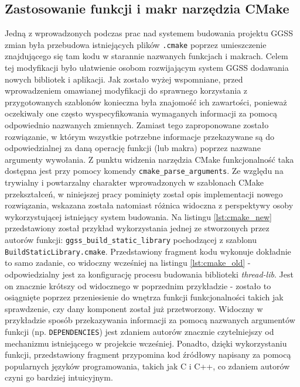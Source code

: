 \subsection{Zastosowanie funkcji i makr narzędzia CMake}
Jedną z wprowadzonych podczas prac nad systemem budowania projektu GGSS zmian była przebudowa istniejących plików \lstinline{.cmake} poprzez umieszczenie znajdującego się tam kodu w starannie nazwanych funkcjach i makrach. Celem tej modyfikacji było ułatwienie osobom rozwijającym system GGSS dodawania nowych bibliotek i aplikacji. Jak zostało wyżej wspomniane, przed wprowadzeniem omawianej modyfikacji do sprawnego korzystania z przygotowanych szablonów konieczna była znajomość ich zawartości, ponieważ oczekiwały one często wyspecyfikowania wymaganych informacji za pomocą odpowiednio nazwanych zmiennych. Zamiast tego zaproponowane zostało rozwiązanie, w którym wszystkie potrzebne informacje przekazywane są do odpowiedzialnej za daną operację funkcji (lub makra) poprzez nazwane argumenty wywołania. Z punktu widzenia narzędzia CMake funkcjonalność taka dostępna jest przy pomocy komendy \lstinline{cmake_parse_arguments}. Ze względu na trywialny i powtarzalny charakter wprowadzonych w szablonach CMake przekształceń, w niniejszej pracy pominięty został opis implementacji nowego rozwiązania, wskazana została natomiast różnica widoczna z perspektywy osoby wykorzystującej istniejący system budowania. Na listingu \ref{lst:cmake_new} przedstawiony został przykład wykorzystania jednej ze stworzonych przez autorów funkcji: \lstinline{ggss_build_static_library} pochodzącej z szablonu \lstinline{BuildStaticLibrary.cmake}. Przedstawiony fragment kodu wykonuje dokładnie to samo zadanie, co widoczny wcześniej na listingu \ref{lst:cmake_old} - odpowiedzialny jest za konfigurację procesu budowania biblioteki \emph{thread-lib}. Jest on znacznie krótszy od widocznego w poprzednim przykładzie - zostało to osiągnięte poprzez przeniesienie do wnętrza funkcji funkcjonalności takich jak sprawdzenie, czy dany komponent został już przetworzony. Widoczny w przykładzie sposób przekazywania informacji za pomocą nazwanych argumentów funkcji (np. \lstinline{DEPENDENCIES}) jest zdaniem autorów znacznie czytelniejszy od mechanizmu istniejącego w projekcie wcześniej. Ponadto, dzięki wykorzystaniu funkcji, przedstawiony fragment przypomina kod źródłowy napisany za pomocą popularnych języków programowania, takich jak C i C++, co zdaniem autorów czyni go bardziej intuicyjnym.



